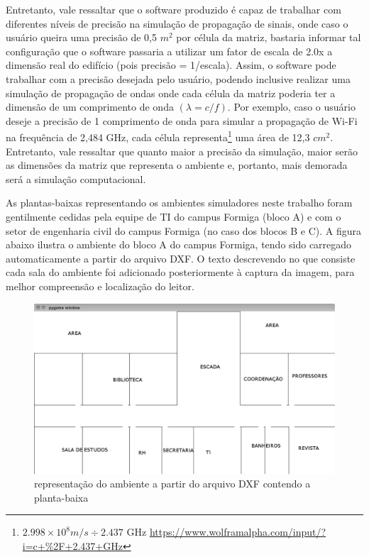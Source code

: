 \documentclass[
	12pt,				%
	openright,			%
	twoside,			%
	a4paper,			%
	english,			%
	french,				%
	spanish,			%
	brazil				%
	]{abntex2}
\begin{document}
Entretanto, vale ressaltar que o software produzido é capaz de trabalhar com diferentes níveis de precisão na simulação de propagação de sinais, onde caso o usuário queira uma precisão de 0,5 $ m^{2} $ por célula da matriz, bastaria informar tal configuração que o software passaria a utilizar um fator de escala de 2.0x a dimensão real do edifício (pois precisão = 1/escala). Assim, o software pode trabalhar com a precisão desejada pelo usuário, podendo inclusive realizar uma simulação de propagação de ondas onde cada célula da matriz poderia ter a dimensão de um comprimento de onda $ (\lambda = c/f) $. Por exemplo, caso o usuário deseje a precisão de 1 comprimento de onda para simular a propagação de Wi-Fi na frequência de 2,484 GHz, cada célula representa\footnote{$2.998\times10^{8} m/s \div 2.437$ GHz \url{https://www.wolframalpha.com/input/?i=c+\%2F+2.437+GHz} } uma área de 12,3 $ cm^{2} $. Entretanto, vale ressaltar que quanto maior a precisão da simulação, maior serão as dimensões da matriz que representa o ambiente e, portanto, mais demorada será a simulação computacional. 

As plantas-baixas representando os ambientes simuladores neste trabalho foram gentilmente cedidas pela equipe de TI do campus Formiga (bloco A) e com o setor de engenharia civil do campus Formiga (no caso dos blocos B e C). A figura abaixo ilustra o ambiente do bloco A do campus Formiga, tendo sido carregado automaticamente a partir do arquivo DXF. O texto descrevendo no que consiste cada sala do ambiente foi adicionado posteriormente à captura da imagem, para melhor compreensão e localização do leitor.

\begin{figure}[htb]
	\caption{\label{repre_ambiente_dxf_1}representação do ambiente a partir do arquivo DXF contendo a planta-baixa}
	\begin{center}
		\includegraphics[scale=0.4]{images/planta-labels.jpg}
	\end{center}
\end{figure}
\end{document}
